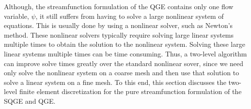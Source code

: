 Although, the streamfunction formulation of the QGE contains only one flow
variable, $\psi$, it still suffers from having to solve a large nonlinear system
of equations. This is usually done by using a nonlinear solver, such as Newton's
method. These nonlinear solvers typically require solving large linear systems
multiple times to obtain the solution to the nonlinear system. Solving these
large linear systems multiple times can be time consuming. Thus, a two-level
algorithm can improve solve times greatly over the standard nonlinear sover,
since we need only solve the nonlinear system on a coarse mesh and then use that
solution to solve a linear system on a fine mesh. To this end, this section
discusses the two-level finite element discretization for the pure
streamfunction formulation of the SQGE and QGE.
